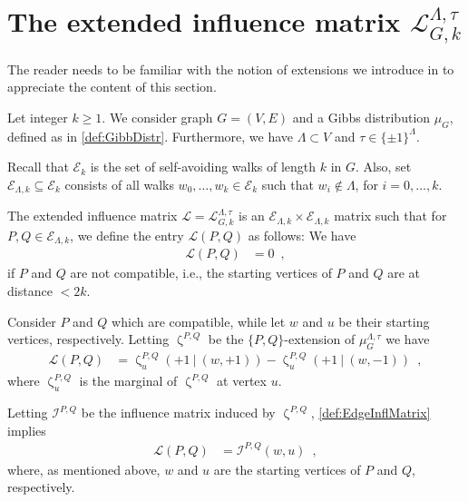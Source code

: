 \documentclass[11pt,reqno]{amsart}
\numberwithin{equation}{section}
\newcommand{\cE}{{\mathcal{E}}}
\newcommand{\cI}{{\mathcal{I}}}
\newcommand{\cL}{{\mathcal{L}}}
\newcommand{\applegreen}[1]{ {\color{applegreen}#1}}
\newcommand{\amethyst}[1]{{\color{amethyst}#1} }
\newcommand{\blue}[1]{{\color{blue}#1}}
\newcommand{\bluepigment}[1]{{\color{blue(pigment)}#1}}
\newcommand{\capri}[1]{{\color{capri}#1}}
\newcommand{\goldenbrown}[1]{{\color{goldenbrown}#1}}
\newcommand{\iris}[1]{{\color{iris}#1}}
\newcommand{\red}[1]{{\color{red}#1}}
\newcommand{\rosegold}[1]{{\color{rosegold}#1}}
\newcommand{\ExtV}{\iris{\cE}}
\newcommand{\infmatrix}{\cI}
\newcommand{\spreadpoint}{\newpage}
\newcommand{\LastReviewG}[1]{{\color{magenta}\hspace{.2cm} [Rev: \textrm{#1} - \bluepigment{G} ] \hspace{.2cm}}}
\renewcommand{\LastReviewG}[1]{}
\renewcommand{\spreadpoint}{}
\renewcommand{\applegreen}[1]{#1}
\renewcommand{\amethyst}[1]{#1}
\renewcommand{\blue}[1]{#1}
\renewcommand{\bluepigment}[1]{#1}
\renewcommand{\capri}[1]{#1}
\renewcommand{\goldenbrown}[1]{#1}
\renewcommand{\iris}[1]{#1}
\renewcommand{\red}[1]{#1}
\renewcommand{\rosegold}[1]{#1}
\newcommand{\ki}{\capri{i}}
\newcommand{\kk}{\bluepigment{k}}
\newcommand{\kP}{\goldenbrown{P}}
\newcommand{\kQ}{\amethyst{Q}}
\newcommand{\ku}{\red{u}}
\newcommand{\kw}{\blue{w}}
\renewcommand{\ki}{i}
\renewcommand{\kk}{k}
\renewcommand{\kP}{P}
\renewcommand{\kQ}{Q}
\renewcommand{\ku}{u}
\renewcommand{\kw}{w}
\newcommand{\ExtdInfMatrix}{\rosegold{\cL}}
\newcommand{\ExtdInfMatrixF}{\applegreen{\cL}^{\Lambda,\tau}_{G,\kk}}
\newcommand{\spset}{\ExtV}
\begin{document}
\spreadpoint
\section{The extended influence matrix $\ExtdInfMatrixF$ \LastReviewG{2025-03-05}}
\label{sec:ExtInfluenceMatrixNew}
The reader needs to be familiar with the notion of extensions we introduce in  to appreciate the content of this section.

Let integer $k\geq 1$. We consider graph $G=(V,E)$ and a Gibbs distribution $\mu_G$, defined as in \eqref{def:GibbDistr}. Furthermore, 
we have $\Lambda\subset V$ and $\tau\in \{\pm 1\}^{\Lambda}$. 
%


Recall that $\ExtV_{\kk}$ is the set of self-avoiding walks of length $\kk$ in $G$. 
Also, set $\ExtV_{\Lambda, \kk}\subseteq \ExtV_{\kk}$ consists of all walks $\kw_0, \ldots, \kw_{\kk} \in \ExtV_{\kk}$ such that 
$\kw_{\ki}\notin \Lambda$, for $\ki=0,\ldots, \kk$. 





The extended influence matrix $\ExtdInfMatrix=\ExtdInfMatrixF$ is an $\spset_{\Lambda, \kk}\times \spset_{\Lambda, \kk}$ 
matrix such that for $\kP, \kQ \in \ExtV_{\Lambda, \kk}$, we define the entry $\ExtdInfMatrix(\kP,\kQ) $ as follows:
%
We have 
\begin{align}\label{def:EdgeInflMatrixA}
\ExtdInfMatrix(\kP, \kQ) &=0 \enspace, 
\end{align}
if $\kP$ and $\kQ$ are not compatible, i.e., the starting vertices of $\kP$ and $\kQ$ are at distance $< 2\kk$.






Consider $\kP$ and $\kQ$ which are compatible, while let $\kw$ and $\ku$ be their starting vertices, 
respectively.  Letting $\upzeta^{\kP,\kQ}$ be the $\{\kP, \kQ\}$-extension of $\mu^{\Lambda,\tau}_G$
we have
%
\begin{align}\label{def:EdgeInflMatrix}
\ExtdInfMatrix(\kP, \kQ) &=
\upzeta^{\kP,\kQ}_{\ku}(+1\ |\ (\kw,+1)) - \upzeta^{\kP,\kQ}_{\ku}(+1 \ |\ (\kw,-1)) \enspace,
\end{align}
where $\upzeta^{\kP,\kQ}_{\ku}$ is the marginal of $\upzeta^{\kP,\kQ}$ at vertex $\ku$. 







Letting $ \infmatrix^{\kP,\kQ}$ be the influence matrix induced by $\upzeta^{\kP,\kQ}$, 
\eqref{def:EdgeInflMatrix} implies 
\begin{align}\label{def:EdgeInflMatrixEquivalent}
\ExtdInfMatrix(\kP, \kQ) &=\infmatrix^{\kP,\kQ}(\kw,\ku)\enspace, 
\end{align}
where, as mentioned above,   $\kw$ and $\ku$ are the starting vertices of $\kP$ and $\kQ$, respectively. 
\end{document}
